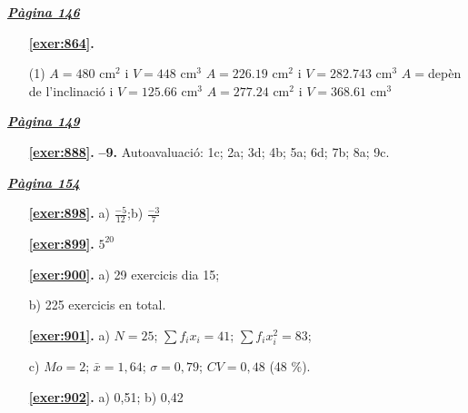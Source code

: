 
\hyperlink{page.146}{\textbf{\em Pàgina 146}}
\begin{enumerate}



 \item[\fontfamily{phv}\selectfont\color{blue}\textbf{\ref{exer:864}. }] \label{ans:864}
 \begin{tasks}[column-sep=1em, item-indent=1.3333em](1)
	 \task* $A=480$ cm$^2$ i $V=448$ cm$^3$
	 \task* $A=226.19$ cm$^2$ i $V=282.743$ cm$^3$
	 \task* $A=$depèn de l'inclinació i $V=125.66$ cm$^3$
	 \task* $A=277.24$ cm$^2$ i $V=368.61$ cm$^3$
\end{tasks}
 \end{enumerate}
\vspace{0.3cm}


\hyperlink{page.149}{\textbf{\em Pàgina 149}}
\begin{enumerate}
\item[\fontfamily{phv}\selectfont\color{blue}\textbf{\ref{exer:888}. }] \label{ans:888} 
\textbf {--9.} Autoavaluació: 1c; 2a; 3d; 4b; 5a; 6d; 7b; 8a; 9c.
 \end{enumerate}

 \vspace{1cm} 
 

\vspace{0.3cm}


\hyperlink{page.154}{\textbf{\em Pàgina 154}}
\begin{enumerate}
\item[\fontfamily{phv}\selectfont\color{blue}\textbf{\ref{exer:898}. }] \label{ans:898} 
 a) $\frac {-5}{12}$;\quad b) $\frac {-3}{7}$
 \end{enumerate}
\begin{enumerate}
\item[\fontfamily{phv}\selectfont\color{blue}\textbf{\ref{exer:899}. }] \label{ans:899} 
 $5^{20}$
\item[\fontfamily{phv}\selectfont\color{blue}\textbf{\ref{exer:900}. }] \label{ans:900} 
a) 29 exercicis dia 15; \par b) 225 exercicis en total.
\item[\fontfamily{phv}\selectfont\color{blue}\textbf{\ref{exer:901}. }] \label{ans:901} 
 a) $N=25$; $\sum f_i x_i = 41$; $\sum f_i x_i^2 =83$;\par c) $Mo=2$; $\bar x=1,64$; $\sigma =0,79$; $CV=0,48$ (48 \%).
\item[\fontfamily{phv}\selectfont\color{blue}\textbf{\ref{exer:902}. }] \label{ans:902} 
 a) 0,51; b) 0,42
 \end{enumerate}
\vspace{0.3cm}

